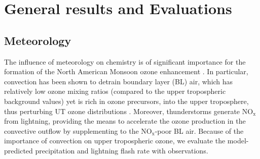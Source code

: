 
\section{General results and Evaluations}\label{sect:results}

\subsection{Meteorology}\label{sect:val/met}

The influence of meteorology on chemistry is of significant importance for the formation of
the North American Monsoon ozone enhancement \citep{Li:2005ss,Cooper:2007cr,Barth:2012qf}.
In particular, convection has been shown to detrain boundary layer (BL) air, which has relatively low
ozone mixing ratios (compared to the upper tropospheric background values) yet is rich in ozone
precursors, into the upper troposphere, thus perturbing UT ozone distributions
\citep{Dickerson:1987hc,Kar:2004jl,Weinstock:2007yj}. Moreover, thunderstorms generate
NO$_\mathrm{x}$ from lightning, providing the means to accelerate the ozone production
in the convective outflow by supplementing to the NO$_\mathrm{x}$-poor BL air.
Because of the importance of convection on upper tropospheric ozone, we evaluate the
model-predicted precipitation and lightning flash rate with observations.

